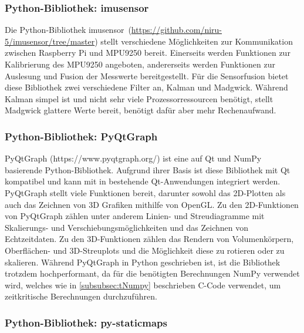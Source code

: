 \subsubsection{Python-Bibliothek: imusensor}
\label{subsubsec:tLibImusensor}
Die Python-Bibliothek \glqq imusensor\grqq\ (\url{https://github.com/niru-5/imusensor/tree/master}) stellt verschiedene Möglichkeiten zur Kommunikation zwischen Raspberry Pi und MPU9250 bereit. Einerseits werden Funktionen zur Kalibrierung des MPU9250 angeboten, andererseits werden Funktionen zur Auslesung und Fusion der Messwerte bereitgestellt. Für die Sensorfusion bietet diese Bibliothek zwei verschiedene Filter an, Kalman und Madgwick. Während Kalman simpel ist und nicht sehr viele Prozessorressourcen benötigt, stellt Madgwick glattere Werte bereit, benötigt dafür aber mehr Rechenaufwand.

\subsubsection{Python-Bibliothek: PyQtGraph}
\label{subsubsec:tPyQtGraph}
PyQtGraph (https://www.pyqtgraph.org/) ist eine auf Qt und NumPy basierende Python-Bibliothek. Aufgrund ihrer Basis ist diese Bibliothek mit Qt kompatibel und kann mit in bestehende Qt-Anwendungen integriert werden. PyQtGraph stellt viele Funktionen bereit, darunter sowohl das \ac{2D}-Plotten als auch das Zeichnen von \ac{3D} Grafiken mithilfe von OpenGL. Zu den \ac{2D}-Funktionen von PyQtGraph zählen unter anderem Linien- und Streudiagramme mit Skalierungs- und Verschiebungsmöglichkeiten und das Zeichnen von Echtzeitdaten. Zu den \ac{3D}-Funktionen zählen das Rendern von Volumenkörpern, Oberflächen- und \ac{3D}-Streuplots und die Möglichkeit diese zu rotieren oder zu skalieren. Während PyQtGraph in Python geschrieben ist, ist die Bibliothek trotzdem hochperformant, da für die benötigten Berechnungen NumPy verwendet wird, welches wie in \ref{subsubsec:tNumpy} beschrieben C-Code verwendet, um zeitkritische Berechnungen durchzuführen.

\subsubsection{Python-Bibliothek: py-staticmaps}
\label{subsubsec:tStaticmaps}

